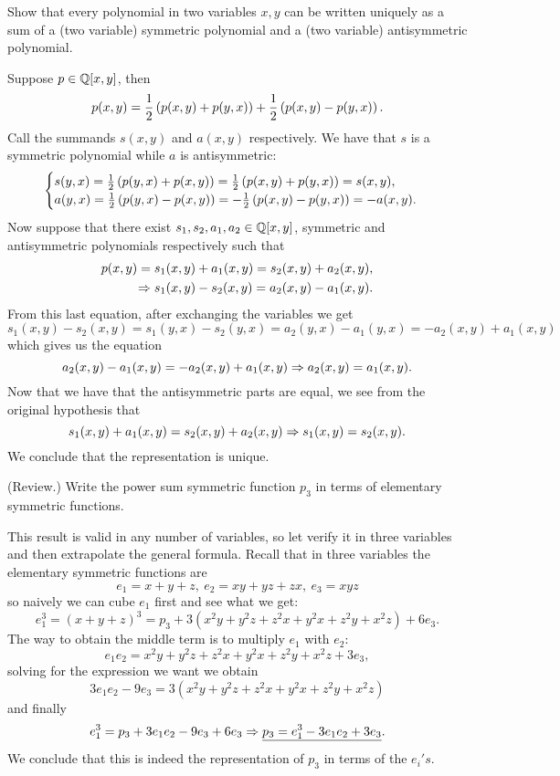 \documentclass[12pt]{memoir}
\begin{document}
\begin{Ej}[Exercise 1]
    Show that every polynomial in two variables $x,y$ can be written uniquely as a sum of a
    (two variable) symmetric polynomial and a (two variable) antisymmetric polynomial.
\end{Ej}

\begin{ptcbr}
Suppose $p\in\mathbb{Q}[x,y]$, then 
$$p(x,y)=\half\left(p(x,y)+p(y,x)\right)+\half\left(p(x,y)-p(y,x)\right).$$
Call the summands $s(x,y)$ and $a(x,y)$ respectively. We have that $s$ is a symmetric polynomial while $a$ is antisymmetric:
$$\begin{cases}
    s(y,x)=\half\left(p(y,x)+p(x,y)\right)=\half\left(p(x,y)+p(y,x)\right)=s(x,y),\\
    a(y,x)=\half\left(p(y,x)-p(x,y)\right)=-\half\left(p(x,y)-p(y,x)\right)=-a(x,y).
\end{cases}$$
Now suppose that there exist $s_1,s_2,a_1,a_2\in\mathbb{Q}[x,y]$, symmetric and antisymmetric polynomials respectively such that 
\begin{align*}
    p(x,y)=s_1(x,y)+a_1(x,y)=s_2(x,y)+a_2(x,y),\\
    \Rightarrow s_1(x,y)-s_2(x,y)=a_2(x,y)-a_1(x,y).
\end{align*}
From this last equation, after exchanging the variables we get
$$s_1(x,y)-s_2(x,y)=s_1(y,x)-s_2(y,x)=a_2(y,x)-a_1(y,x)=-a_2(x,y)+a_1(x,y)$$ 
which gives us the equation 
$$a_2(x,y)-a_1(x,y)=-a_2(x,y)+a_1(x,y)\Rightarrow a_2(x,y)=a_1(x,y).$$
Now that we have that the antisymmetric parts are equal, we see from the original hypothesis that 
$$s_1(x,y)+a_1(x,y)=s_2(x,y)+a_2(x,y)\Rightarrow s_1(x,y)=s_2(x,y).$$
We conclude that the representation is unique.
\end{ptcbr}

\begin{Ej}[Exercise 2]
    (Review.) Write the power sum symmetric function $p_3$ in terms of elementary symmetric
functions.
\end{Ej}

\begin{ptcbr}
This result is valid in any number of variables, so let verify it in three variables and then extrapolate the general formula. Recall that in three variables the elementary symmetric functions are 
$$e_1=x+y+z,\ e_2=xy+yz+zx,\ e_3=xyz$$
so naively we can cube $e_1$ first and see what we get:
$$e_1^3=(x+y+z)^3=p_3+3(x^2y+y^2z+z^2x+y^2x+z^2y+x^2z)+6e_3.$$
The way to obtain the middle term is to multiply $e_1$ with $e_2$:
$$e_1e_2=x^2y+y^2z+z^2x+y^2x+z^2y+x^2z+3e_3,$$
solving for the expression we want we obtain 
$$3e_1e_2-9e_3=3(x^2y+y^2z+z^2x+y^2x+z^2y+x^2z)$$
and finally 
$$e_1^3=p_3+3e_1e_2-9e_3+6e_3\Rightarrow \underline{p_3=e_1^3-3e_1e_2+3e_3}.$$
We conclude that this is indeed the representation of $p_3$ in terms of the $e_i's$. 
\end{ptcbr}
\end{document}
